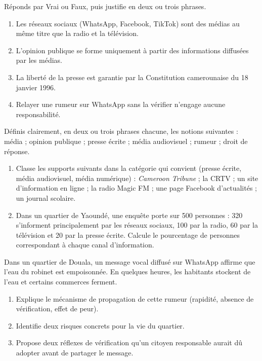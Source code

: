 \documentclass[11pt]{article}
\newcounter{popsec}
\newcounter{popsub}
\newcommand{\courssub}[1]{%
  \stepcounter{popsub}%
  \par\vspace{9pt}\noindent{\popxbold\fontsize{11.5}{13}\selectfont\color{popink}{\color{poporange}\thepopsec.\thepopsub}\hspace{6pt}#1}\par\nopagebreak\vspace{4pt}
}
\begin{document}
\begin{exercice}
Réponds par Vrai ou Faux, puis justifie en deux ou trois phrases.
\begin{enumerate}
\item Les réseaux sociaux (WhatsApp, Facebook, TikTok) sont des médias au même titre que la radio et la télévision.
\item L'opinion publique se forme uniquement à partir des informations diffusées par les médias.
\item La liberté de la presse est garantie par la Constitution camerounaise du 18 janvier 1996.
\item Relayer une rumeur sur WhatsApp sans la vérifier n'engage aucune responsabilité.
\end{enumerate}
\end{exercice}

\begin{exercice}[Je définis]
Définis clairement, en deux ou trois phrases chacune, les notions suivantes : média ; opinion publique ; presse écrite ; média audiovisuel ; rumeur ; droit de réponse.
\end{exercice}

\begin{exercice}
\begin{enumerate}
\item Classe les supports suivants dans la catégorie qui convient (presse écrite, média audiovisuel, média numérique) : \emph{Cameroon Tribune} ; la CRTV ; un site d'information en ligne ; la radio Magic FM ; une page Facebook d'actualités ; un journal scolaire.
\item Dans un quartier de Yaoundé, une enquête porte sur 500 personnes : 320 s'informent principalement par les réseaux sociaux, 100 par la radio, 60 par la télévision et 20 par la presse écrite. Calcule le pourcentage de personnes correspondant à chaque canal d'information.
\end{enumerate}
\end{exercice}

\courssub{Je m'entraîne}

\begin{exercice}
Dans un quartier de Douala, un message vocal diffusé sur WhatsApp affirme que l'eau du robinet est empoisonnée. En quelques heures, les habitants stockent de l'eau et certains commerces ferment.
\begin{enumerate}
\item Explique le mécanisme de propagation de cette rumeur (rapidité, absence de vérification, effet de peur).
\item Identifie deux risques concrets pour la vie du quartier.
\item Propose deux réflexes de vérification qu'un citoyen responsable aurait dû adopter avant de partager le message.
\end{enumerate}
\end{exercice}
\end{document}
